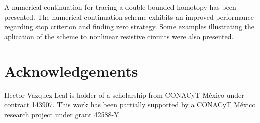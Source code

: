 \documentclass[conference]{IEEEtran}
\begin{document}
A numerical continuation for tracing a double bounded homotopy has
been presented. The numerical continuation scheme exhibits an improved
performance regarding stop criterion and finding zero strategy.
Some examples illustrating the aplication of the scheme to nonlinear
resistive circuits were also presented.



\section*{Acknowledgements}
Hector Vazquez Leal is holder of a scholarship from CONACyT M\'exico under contract 143907. This work has been partially supported by a CONACyT M\'exico research project under grant 42588-Y.




 


\IEEEpeerreviewmaketitle
\end{document}
